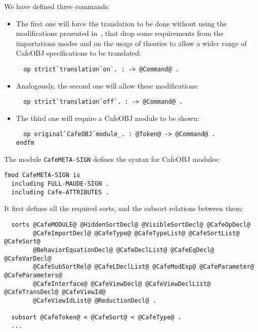 We have defined three commands:
\begin{itemize}
\item
The first one will force the translation to be done without using the modifications
presented in~\cite{cafeOBJ2maudeUG}, that drop some requirements from the importations
modes and on the usage of theories to allow a wider range of CafeOBJ specifications to
be translated:

{\codesize
\begin{verbatim}
  op strict`translation`on`. : -> @Command@ .
\end{verbatim}
}

\item
Analogously, the second one will allow these modifications:

{\codesize
\begin{verbatim}
  op strict`translation`off`. : -> @Command@ .
\end{verbatim}
}

\item
The third one will require a CafeOBJ module to be shown:

{\codesize
\begin{verbatim}
  op original`CafeOBJ`module_. : @Token@ -> @Command@ .
endfm
\end{verbatim}
}

\end{itemize}

The module \verb"CafeMETA-SIGN" defines the syntax for CafeOBJ modules:

{\codesize
\begin{verbatim}
fmod CafeMETA-SIGN is
  including FULL-MAUDE-SIGN .
  including Cafe-ATTRIBUTES .
\end{verbatim}
}

It first defines all the required sorts, and the subsort relations between them:

{\codesize
\begin{verbatim}
  sorts @CafeMODULE@ @HiddenSortDecl@ @VisibleSortDecl@ @CafeOpDecl@
        @CafeImportDecl@ @CafeType@ @CafeTypeList@ @CafeSortList@ @CafeSort@
        @BehaviorEquationDecl@ @CafeDeclList@ @CafeEqDecl@ @CafeVarDecl@
        @CafeSubSortRel@ @CafeLDeclList@ @CafeModExp@ @CafeParameter@ @CafeParameters@
        @CafeInterface@ @CafeViewDecl@ @CafeViewDeclList@ @CafeTransDecl@ @CafeViewId@
        @CafeViewIdList@ @ReductionDecl@ .

  subsort @CafeToken@ < @CafeSort@ < @CafeType@ .
  ...
\end{verbatim}
}

